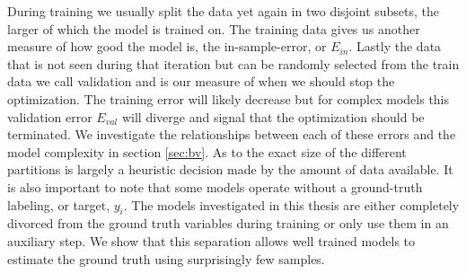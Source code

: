 During training we usually split the data yet again in two disjoint subsets, the larger of which the model is trained on. The training data gives us another measure of how good the model is, the in-sample-error, or $E_{in}$. Lastly the data that is not seen during that iteration but can be randomly selected from the train data we call validation and is our measure of when we should stop the optimization. The training error will likely decrease but for complex models this validation error $E_{val}$ will diverge and signal that the optimization should be terminated. We investigate the relationships between each of these errors and the model complexity in section \ref{sec:bv}. As to the exact size of the different partitions is largely a heuristic decision made by the amount of data available. It is also important to note that some models operate without a ground-truth labeling, or target, $y_i$. The models investigated in this thesis are either completely divorced from the ground truth variables during training or only use them in an auxiliary step. We show that this separation allows well trained models to estimate the ground truth using surprisingly few samples. 